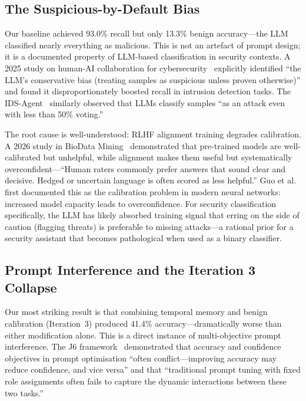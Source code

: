\documentclass[12pt, a4paper, oneside]{report}
\begin{document}
\subsection{The Suspicious-by-Default Bias}

Our baseline achieved 93.0\% recall but only 13.3\% benign accuracy---the LLM
classified nearly everything as malicious. This is not an artefact of prompt design;
it is a documented property of LLM-based classification in security contexts. A
2025 study on human-AI collaboration for cybersecurity~\cite{bridging2025}
explicitly identified ``the LLM's conservative bias (treating samples as suspicious
unless proven otherwise)'' and found it disproportionately boosted recall in
intrusion detection tasks. The IDS-Agent~\cite{li2024idsagent} similarly observed
that LLMs classify samples ``as an attack even with less than 50\% voting.''

The root cause is well-understood: RLHF alignment training degrades
calibration. A 2026 study in BioData Mining~\cite{overconfidence2026} demonstrated
that pre-trained models are well-calibrated but unhelpful, while alignment makes
them useful but systematically overconfident---``Human raters commonly prefer
answers that sound clear and decisive. Hedged or uncertain language is often scored
as less helpful.'' Guo et al.~\cite{guo2017calibration} first documented this as
the calibration problem in modern neural networks: increased model capacity leads
to overconfidence. For security classification specifically, the LLM has likely
absorbed training signal that erring on the side of caution (flagging threats)
is preferable to missing attacks---a rational prior for a security assistant that
becomes pathological when used as a binary classifier.

\subsection{Prompt Interference and the Iteration 3 Collapse}

Our most striking result is that combining temporal memory and benign calibration
(Iteration~3) produced 41.4\% accuracy---dramatically worse than either modification
alone. This is a direct instance of multi-objective prompt interference. The J6
framework~\cite{j6framework2025} demonstrated that accuracy and confidence
objectives in prompt optimisation ``often conflict---improving accuracy may reduce
confidence, and vice versa'' and that ``traditional prompt tuning with fixed role
assignments often fails to capture the dynamic interactions between these two
tasks.''
\end{document}
